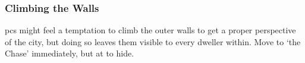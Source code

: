 \begin{multicols}{2}
\begin{itemize}
\end{itemize}

\subsubsection{Climbing the Walls}

\Glspl{pc} might feel a temptation to climb the outer walls to get a proper perspective of the city, but doing so leaves them visible to every dweller within.
Move to `the Chase' immediately, but at \tn[12] to hide.

\end{multicols}

\foragingChart

